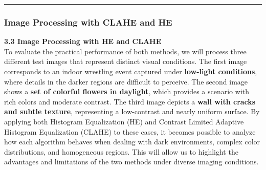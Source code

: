 \documentclass[11pt]{article}
\begin{document}
    \begin{center}\rule{0.5\linewidth}{0.5pt}\end{center}

\hypertarget{image-processing-with-clahe-and-he}{%
\subsubsection{Image Processing with CLAHE and
HE}\label{image-processing-with-clahe-and-he}}

\textbf{3.3 Image Processing with HE and CLAHE}\\
To evaluate the practical performance of both methods, we will process
three different test images that represent distinct visual conditions.
The first image corresponds to an indoor wrestling event captured under
\textbf{low-light conditions}, where details in the darker regions are
difficult to perceive. The second image shows a \textbf{set of colorful
flowers in daylight}, which provides a scenario with rich colors and
moderate contrast. The third image depicts a \textbf{wall with cracks
and subtle texture}, representing a low-contrast and nearly uniform
surface. By applying both Histogram Equalization (HE) and Contrast
Limited Adaptive Histogram Equalization (CLAHE) to these cases, it
becomes possible to analyze how each algorithm behaves when dealing with
dark environments, complex color distributions, and homogeneous regions.
This will allow us to highlight the advantages and limitations of the
two methods under diverse imaging conditions.
\end{document}
